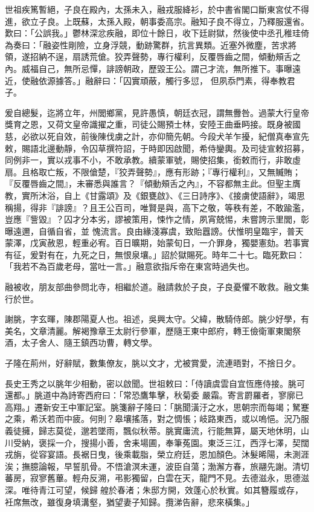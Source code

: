 \begin{pinyinscope}
 世祖疾篤暫絕，子良在殿內，太孫未入，融戎服絳衫，於中書省閣口斷東宮仗不得進，欲立子良。上既蘇，太孫入殿，朝事委高宗。融知子良不得立，乃釋服還省。歎曰：「公誤我。」鬱林深忿疾融，即位十餘日，收下廷尉獄，然後使中丞孔稚珪倚為奏曰：「融姿性剛險，立身浮競，動跡驚群，抗言異類。近塞外微塵，苦求將領，遂招納不逞，扇誘荒傖。狡弄聲勢，專行權利，反覆唇齒之間，傾動頰舌之內。威福自己，無所忌憚，誹謗朝政，歷毀王公。謂己才流，無所推下。事曝遠近，使融依源據答。」融辭曰：「囚實頑蔽，觸行多愆，
 但夙忝門素，得奉教君子。



 爰自總髮，迄將立年，州閭鄉黨，見許愚慎，朝廷衣冠，謂無釁咎。過蒙大行皇帝獎育之恩，又荷文皇帝識擢之重，司徒公賜預士林，安陸王曲垂眄接。既身被國慈，必欲以死自效，前後陳伐虜之計，亦仰簡先朝。今段犬羊乍擾，紀僧真奉宣先敕，賜語北邊動靜，令囚草撰符詔，于時即因啟聞，希侍鑾輿。及司徒宣敕招募，同例非一，實以戎事不小，不敢承教。續蒙軍號，賜使招集，銜敕而行，非敢虛扇。且格取亡叛，不限傖楚，『狡弄聲勢』，應有形跡；『專行權利』，又無贓賄；『反覆唇齒之間』，未審悉與誰言？『傾動頰舌之內』，不容都無主此。但聖主膺教，實所沐浴，自上《甘露頌》及《銀甕啟》、《三日詩序》、《接虜使語辭》，竭思稱揚，得非『誹謗』？且王公百司，唯賢是與，高下之敬，等秩有差，不敢踰濫，豈應『訾毀』？囚才分本劣，謬被策用，悚怍之情，夙宵兢惕，未嘗誇示里閭，彰曝遠邇，自循自省，並
 愧流言。良由緣淺寡虞，致貽囂謗。伏惟明皇臨宇，普天蒙澤，戊寅赦恩，輕重必宥。百日曠期，始蒙旬日，一介罪身，獨嬰憲劾。若事實有征，爰對有在，九死之日，無恨泉壤。」詔於獄賜死。時年二十七。臨死歎曰：「我若不為百歲老母，當吐一言。」融意欲指斥帝在東宮時過失也。



 融被收，朋友部曲參問北寺，相繼於道。融請救於子良，子良憂懼不敢救。融文集行於世。



 謝朓，字玄暉，陳郡陽夏人也。祖述，吳興太守。父緯，散騎侍郎。朓少好學，有美名，文章清麗。解褐豫章王太尉行參軍，歷隨王東中郎府，轉王儉衛軍東閣祭酒，太子舍人、隨王鎮西功曹，轉文學。



 子隆在荊州，好辭賦，數集僚友，朓以文才，尤被賞愛，流連晤對，不捨日夕。



 長史王秀之以朓年少相動，密以啟聞。世祖敕曰：「侍讀虞雲自宜恆應侍接。朓可還都。」朓道中為詩寄西府曰：「常恐鷹隼擊，秋菊委
 嚴霜。寄言罻羅者，寥廓已高翔。」遷新安王中軍記室。朓箋辭子隆曰：「朓聞潢汙之水，思朝宗而每竭；駑蹇之乘，希沃若而中疲。何則？皋壤搖落，對之惆悵；岐路東西，或以嗚悒。況乃服義徒擁，歸志莫從，邈若墜雨，飄似秋蒂。朓實庸流，行能無算，屬天地休明，山川受納，褒採一介，搜揚小善，舍耒場圃，奉筆菟園。東泛三江，西浮七澤，契闊戎旃，從容宴語。長裾日曳，後乘載脂，榮立府廷，恩加顏色。沐髮晞陽，未測涯涘；撫臆論報，早誓肌骨。不悟滄溟未運，波臣自蕩；渤澥方春，旅翮先謝。清切蕃房，寂寥舊蓽。輕舟反溯，弔影獨留，白雲在天，龍門不見。去德滋永，思德滋深。唯待青江可望，候歸艎於春渚；朱邸方開，效蓬心於秋實。如其簪履或存，衽席無改，雖復身填溝壑，猶望妻子知歸。攬涕告辭，悲來橫集。」




\end{pinyinscope}
